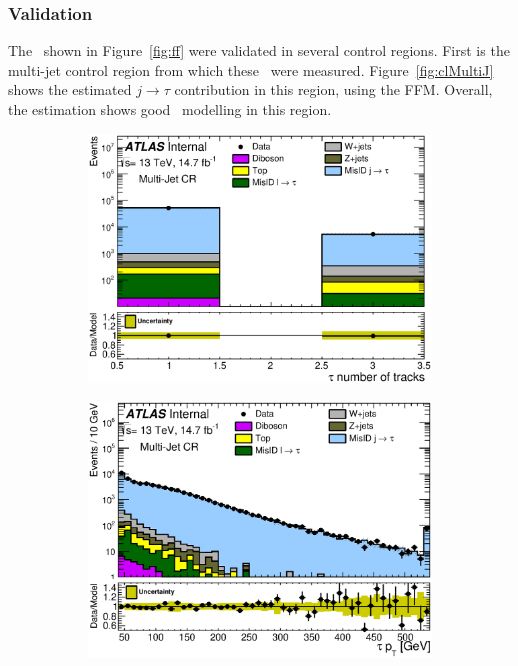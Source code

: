 \subsubsection{Validation}
\par The \FF\ shown in Figure~\ref{fig:ff} were validated in several control regions. First is the 
multi-jet control region from which these \FF\ were measured. Figure~\ref{fig:clMultiJ} shows the 
estimated $j\to\tau$ contribution in this region, using the FFM. Overall, the estimation shows good 
\FF\ modelling in this region. 

\begin{figure}[h]
\begin{subfigure}{0.5\textwidth}
   \includegraphics[width=\textwidth]{figures/DDQCD15_QCD_nTrack.eps}
\caption{}
\end{subfigure} %
\begin{subfigure}{0.5\textwidth}
   \includegraphics[width=\textwidth]{figures/DDQCD15_QCD_taupt_log.eps}

\end{subfigure}
\end{figure}
